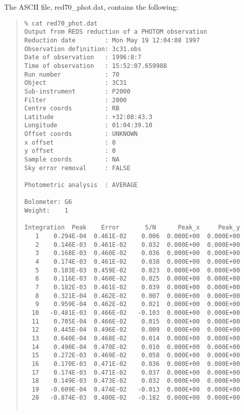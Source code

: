 \documentclass[twoside,11pt,fleqn]{article}
\newenvironment{myquote}{\begin{quote}\begin{small}}{\end{small}\end{quote}}
\begin{document}
The ASCII file, red70\_phot.dat, contains the following:

\begin{myquote}
\begin{verbatim} 
% cat red70_phot.dat
Output from REDS reduction of a PHOTOM observation           
Reduction date        : Mon May 19 12:04:08 1997             
Observation definition: 3c31.obs                             
Date of observation   : 1996:8:7                             
Time of observation   : 15:52:07.659988                      
Run number            : 70                                   
Object                : 3C31                                 
Sub-instrument        : P2000                                
Filter                : 2000                                 
Centre coords         : RB                                   
Latitude              : +32:08:43.3                          
Longitude             : 01:04:39.10                          
Offset coords         : UNKNOWN                              
x offset              : 0                                    
y offset              : 0                                    
Sample coords         : NA                                   
Sky error removal     : FALSE                                
 							     
Photometric analysis  : AVERAGE                              
 							     
Bolometer: G6                                                
Weight:    1                                                 
 							     
Integration  Peak    Error       S/N      Peak_x     Peak_y  
   1    0.294E-04  0.461E-02    0.006  0.000E+00  0.000E+00  
   2    0.146E-03  0.461E-02    0.032  0.000E+00  0.000E+00  
   3    0.168E-03  0.460E-02    0.036  0.000E+00  0.000E+00  
   4    0.174E-03  0.461E-02    0.038  0.000E+00  0.000E+00  
   5    0.103E-03  0.459E-02    0.023  0.000E+00  0.000E+00  
   6    0.116E-03  0.460E-02    0.025  0.000E+00  0.000E+00  
   7    0.182E-03  0.461E-02    0.039  0.000E+00  0.000E+00  
   8    0.321E-04  0.462E-02    0.007  0.000E+00  0.000E+00  
   9    0.959E-04  0.462E-02    0.021  0.000E+00  0.000E+00  
  10   -0.481E-03  0.466E-02   -0.103  0.000E+00  0.000E+00  
  11    0.705E-04  0.466E-02    0.015  0.000E+00  0.000E+00  
  12    0.445E-04  0.496E-02    0.009  0.000E+00  0.000E+00  
  13    0.640E-04  0.468E-02    0.014  0.000E+00  0.000E+00  
  14    0.490E-04  0.470E-02    0.010  0.000E+00  0.000E+00  
  15    0.272E-03  0.469E-02    0.058  0.000E+00  0.000E+00  
  16    0.170E-03  0.471E-02    0.036  0.000E+00  0.000E+00  
  17    0.174E-03  0.471E-02    0.037  0.000E+00  0.000E+00  
  18    0.149E-03  0.473E-02    0.032  0.000E+00  0.000E+00  
  19   -0.609E-04  0.474E-02   -0.013  0.000E+00  0.000E+00  
  20   -0.874E-03  0.480E-02   -0.182  0.000E+00  0.000E+00  
 							     

\end{verbatim}
\end{myquote}
\end{document}

